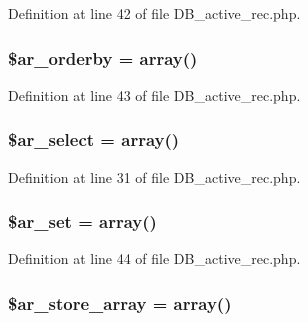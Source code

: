 Definition at line 42 of file D\-B\-\_\-active\-\_\-rec.\-php.

\hypertarget{class_c_i___d_b__active__record_a3880e9552e8633df582665611281d5ee}{
\subsubsection[{\$ar\-\_\-orderby}]{\setlength{\rightskip}{0pt plus 5cm}\$ar\-\_\-orderby = array()}}\label{class_c_i___d_b__active__record_a3880e9552e8633df582665611281d5ee}


Definition at line 43 of file D\-B\-\_\-active\-\_\-rec.\-php.

\hypertarget{class_c_i___d_b__active__record_a6e20fdd21772a1afe552931b7e8226b7}{
\subsubsection[{\$ar\-\_\-select}]{\setlength{\rightskip}{0pt plus 5cm}\$ar\-\_\-select = array()}}\label{class_c_i___d_b__active__record_a6e20fdd21772a1afe552931b7e8226b7}


Definition at line 31 of file D\-B\-\_\-active\-\_\-rec.\-php.

\hypertarget{class_c_i___d_b__active__record_a689f677e0352b03a1a51f9b3ef30a663}{
\subsubsection[{\$ar\-\_\-set}]{\setlength{\rightskip}{0pt plus 5cm}\$ar\-\_\-set = array()}}\label{class_c_i___d_b__active__record_a689f677e0352b03a1a51f9b3ef30a663}


Definition at line 44 of file D\-B\-\_\-active\-\_\-rec.\-php.

\hypertarget{class_c_i___d_b__active__record_a58c4c18055f541856de85275840aa24c}{
\subsubsection[{\$ar\-\_\-store\-\_\-array}]{\setlength{\rightskip}{0pt plus 5cm}\$ar\-\_\-store\-\_\-array = array()}}\label{class_c_i___d_b__active__record_a58c4c18055f541856de85275840aa24c}



